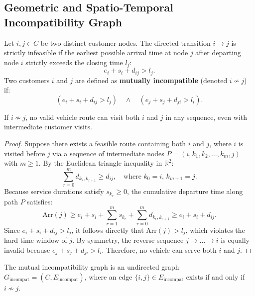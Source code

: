 \subsection{Geometric and Spatio-Temporal Incompatibility Graph}
\begin{definition}
Let $i, j \in C$ be two distinct customer nodes. The directed transition $i \to j$ is strictly infeasible if the earliest possible arrival time at node $j$ after departing node $i$ strictly exceeds the closing time $l_j$:
\begin{equation}
e_i + s_i + d_{ij} > l_j.
\end{equation}
Two customers $i$ and $j$ are defined as \textbf{mutually incompatible} (denoted $i \nsim j$) if:
\begin{equation}
(e_i + s_i + d_{ij} > l_j) \quad \land \quad (e_j + s_j + d_{ji} > l_i).
\end{equation}
\end{definition}

\begin{lemma}
\label{lem:triangle}
If $i \nsim j$, no valid vehicle route can visit both $i$ and $j$ in any sequence, even with intermediate customer visits.
\end{lemma}
\begin{proof}
Suppose there exists a feasible route containing both $i$ and $j$, where $i$ is visited before $j$ via a sequence of intermediate nodes $P = (i, k_1, k_2, \dots, k_m, j)$ with $m \ge 1$. By the Euclidean triangle inequality in $\mathbb{R}^2$:
\begin{equation}
\sum_{r=0}^m d_{k_r, k_{r+1}} \ge d_{ij}, \quad \text{where } k_0 = i, \, k_{m+1} = j.
\end{equation}
Because service durations satisfy $s_{k_r} \ge 0$, the cumulative departure time along path $P$ satisfies:
\begin{equation}
\text{Arr}(j) \ge e_i + s_i + \sum_{r=1}^m s_{k_r} + \sum_{r=0}^m d_{k_r, k_{r+1}} \ge e_i + s_i + d_{ij}.
\end{equation}
Since $e_i + s_i + d_{ij} > l_j$, it follows directly that $\text{Arr}(j) > l_j$, which violates the hard time window of $j$. By symmetry, the reverse sequence $j \to \dots \to i$ is equally invalid because $e_j + s_j + d_{ji} > l_i$. Therefore, no vehicle can serve both $i$ and $j$.
\end{proof}

\begin{definition}
The mutual incompatibility graph is an undirected graph $G_{\text{incompat}} = (C, E_{\text{incompat}})$, where an edge $\{i, j\} \in E_{\text{incompat}}$ exists if and only if $i \nsim j$.
\end{definition}

